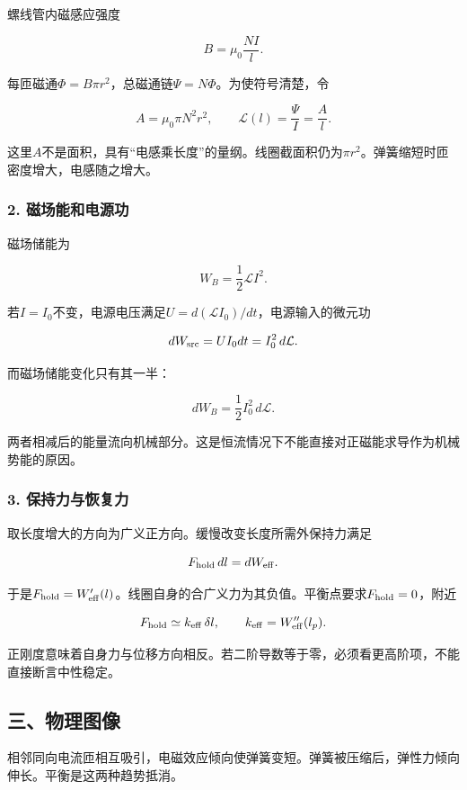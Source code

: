 \documentclass[12pt,a4paper,fontset=fandol]{ctexart}
\begin{document}
螺线管内磁感应强度

\[
B=\mu_0\frac{NI}{l}.
\]

每匝磁通\(\Phi=B\pi r^2\)，总磁通链\(\Psi=N\Phi\)。为使符号清楚，令

\[
A=\mu_0\pi N^2r^2,\qquad
\mathcal L(l)=\frac{\Psi}{I}=\frac Al.
\]

这里\(A\)不是面积，具有``电感乘长度''的量纲。线圈截面积仍为\(\pi r^2\)。弹簧缩短时匝密度增大，电感随之增大。

\subsubsection{2.
磁场能和电源功}\label{ux78c1ux573aux80fdux548cux7535ux6e90ux529f}

磁场储能为

\[
W_B=\frac12\mathcal LI^2.
\]

若\(I=I_0\)不变，电源电压满足\(U=d(\mathcal LI_0)/dt\)，电源输入的微元功

\[
dW_{\rm src}=UI_0dt=I_0^2\,d\mathcal L.
\]

而磁场储能变化只有其一半：

\[
dW_B=\frac12I_0^2\,d\mathcal L.
\]

两者相减后的能量流向机械部分。这是恒流情况下不能直接对正磁能求导作为机械势能的原因。

\subsubsection{3.
保持力与恢复力}\label{ux4fddux6301ux529bux4e0eux6062ux590dux529b}

取长度增大的方向为广义正方向。缓慢改变长度所需外保持力满足

\[
F_{\rm hold}\,dl=dW_{\rm eff}.
\]

于是\(F_{\rm hold}=W'_{\rm eff}(l)\)。线圈自身的合广义力为其负值。平衡点要求\(F_{\rm hold}=0\)，附近

\[
F_{\rm hold}\simeq k_{\rm eff}\,\delta l,
\qquad k_{\rm eff}=W''_{\rm eff}(l_p).
\]

正刚度意味着自身力与位移方向相反。若二阶导数等于零，必须看更高阶项，不能直接断言中性稳定。

\subsection{三、物理图像}\label{ux4e09ux7269ux7406ux56feux50cf-1}

相邻同向电流匝相互吸引，电磁效应倾向使弹簧变短。弹簧被压缩后，弹性力倾向伸长。平衡是这两种趋势抵消。
\end{document}
